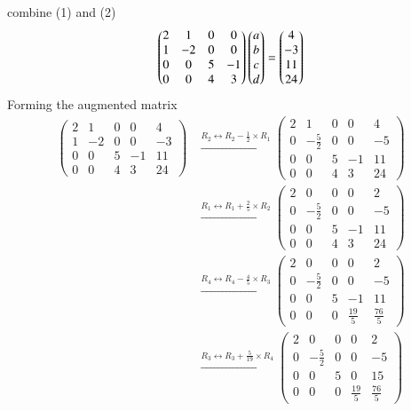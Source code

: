 \documentclass[journal]{IEEEtran}
\begin{document}
combine (1) and (2)
\begin{align}
    \begin{pmatrix}
        2 & 1 & 0 & 0\\
        1 & -2 & 0 & 0\\
        0 & 0 & 5 & -1\\
        0 & 0 & 4 & 3
        \end{pmatrix} \begin{pmatrix}a\\b\\c\\d\end{pmatrix}=\begin{pmatrix}4\\-3\\11\\24\end{pmatrix}
\end{align}
Forming the augmented matrix\\
\begin{align}
    \left(\begin{array}{cccc|c}
       2 & 1 & 0 & 0 & 4\\
        1 & -2 & 0 & 0 & -3\\
        0 & 0 & 5 & -1 & 11\\
        0 & 0 & 4 & 3 & 24
\end{array}\right) &\xrightarrow{R_2 \leftrightarrow R_2-\frac{1}{2}\times R_1}
\left(\begin{array}{cccc|c}
       2 & 1 & 0 & 0 & 4\\
        0 & -\frac{5}{2} & 0 & 0 & -5\\
        0 & 0 & 5 & -1 & 11\\
        0 & 0 & 4 & 3 & 24
        \end{array}\right)\\ &\xrightarrow{R_1 \leftrightarrow R_1+\frac{2}{5}\times R_2} \left(\begin{array}{cccc|c}
       2 & 0 & 0 & 0 & 2\\
        0 & -\frac{5}{2} & 0 & 0 & -5\\
        0 & 0 & 5 & -1 & 11\\
        0 & 0 & 4 & 3 & 24
        \end{array}\right)\\ &\xrightarrow{R_4 \leftrightarrow R_4-\frac{4}{5}\times R_3} \left(\begin{array}{cccc|c}
       2 & 0 & 0 & 0 & 2\\
        0 & -\frac{5}{2} & 0 & 0 & -5\\
        0 & 0 & 5 & -1 & 11\\
        0 & 0 & 0 & \frac{19}{5} & \frac{76}{5}
        \end{array}\right)\\
         &\xrightarrow{R_3 \leftrightarrow R_3+\frac{5}{19}\times R_4} \left(\begin{array}{cccc|c}
       2 & 0 & 0 & 0 & 2\\
        0 & -\frac{5}{2} & 0 & 0 & -5\\
        0 & 0 & 5 & 0 & 15\\
        0 & 0 & 0 & \frac{19}{5} & \frac{76}{5}
        \end{array}\right)
        \end{align}
\end{document}
